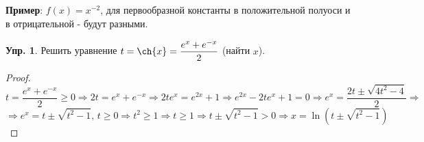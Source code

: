 \documentclass[12pt]{article}
\theoremstyle{definition}
\newtheorem{exrc}{Упр.}
\begin{document}
\textbf{Пример}: $f(x) = x^{-2}$, для первообразной константы в положительной полуоси и в отрицательной - будут разными.

\begin{exrc}
	Решить уравнение $t = \ch{x} = \dfrac{e^x + e^{-x}}{2}$ (найти $x$).
\end{exrc}
\begin{proof}
	$$
		t =  \dfrac{e^x + e^{-x}}{2} \geq 0\Rightarrow 2t = e^x + e^{-x} \Rightarrow 2te^x = e^{2x} + 1 \Rightarrow e^{2x} - 2te^x + 1 =0 \Rightarrow e^x = \dfrac{2t \pm \sqrt{4t^2 - 4}}{2} \Rightarrow
	$$
	$$
		\Rightarrow e^x = t \pm \sqrt{t^2 - 1}, \, t \geq 0 \Rightarrow t^2 \geq 1 \Rightarrow t \geq 1 \Rightarrow t \pm \sqrt{t^2 - 1} > 0 \Rightarrow x = \ln\left(t \pm \sqrt{t^2 - 1}\right)
	$$
\end{proof}
\end{document}
